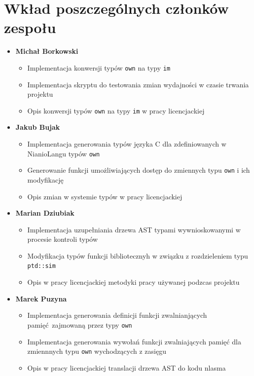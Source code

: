 \documentclass[licencjacka]{pracamgr}
\begin{document}
\chapter{Wkład poszczególnych członków zespołu}
\begin{itemize}
  \item[] \textbf{Michał Borkowski}
  \begin{itemize}
   \item Implementacja konwersji typów \texttt{own} na typy \texttt{im}
   \item Implementacja skryptu do testowania zmian wydajności w czasie trwania projektu
   \item Opis konwersji typów \texttt{own} na typy \texttt{im} w pracy licencjackiej
  \end{itemize}

  \item[] \textbf{Jakub Bujak}
  \begin{itemize}
   \item Implementacja generowania typów języka C dla zdefiniowanych w NianioLangu typów \texttt{own}
   \item Generowanie funkcji umożliwiających dostęp do zmiennych typu \texttt{own} i ich modyfikację
   \item Opis zmian w systemie typów w pracy licencjackiej
  \end{itemize}

  \item[] \textbf{Marian Dziubiak}
  \begin{itemize}
   \item Implementacja uzupełniania drzewa AST typami wywnioskowanymi w procesie kontroli typów
   \item Modyfikacja typów funkcji bibliotecznyh w związku z rozdzieleniem typu \texttt{ptd::sim}
   \item Opis w pracy licencjackiej metodyki pracy używanej podzcas projektu
  \end{itemize}

  \item[] \textbf{Marek Puzyna}
  \begin{itemize}
   \item Implementacja generowania definicji funkcji zwalnianjących pamięć zajmowaną przez typy \texttt{own}
   \item Implementacja generowania wywołań funkcji zwalniających pamięć dla zmiennnych typu \texttt{own} wychodzących
     z zasięgu
   \item Opis w pracy licencjackiej translacji drzewa AST do kodu nlasma
  \end{itemize}


\end{itemize}
\end{document}
